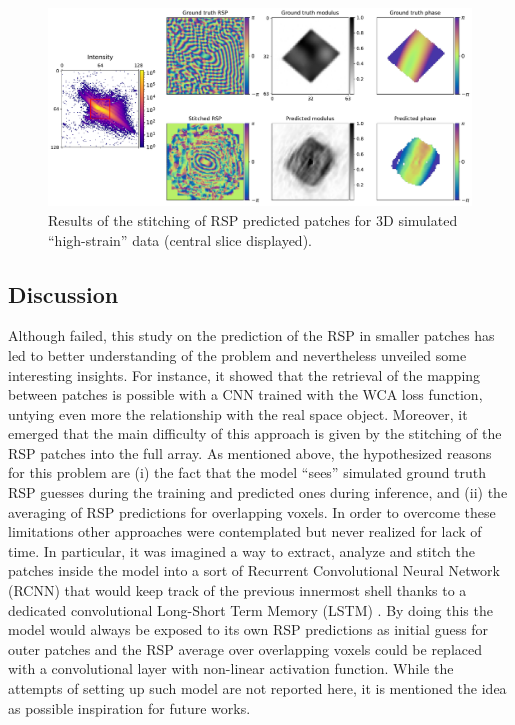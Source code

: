 \begin{figure}[H]
    \centering
    \includegraphics[width=\textwidth]{figures/Phasing/stitching_high_strain_sim.pdf}
    \caption{Results of the stitching of RSP predicted patches for 3D simulated ``high-strain'' data (central slice displayed).}
    \label{fig:stitching_highstrain}
\end{figure}

\subsection{Discussion}
Although failed, this study on the prediction of the RSP in smaller patches has led to better understanding of the problem 
and nevertheless unveiled some interesting insights. For instance, it showed that the retrieval of the mapping between patches 
is possible with a CNN trained with the WCA loss function, untying even more the relationship with the real space object. 
Moreover, it emerged that the main difficulty of this approach is given by the stitching of the RSP patches into the full 
array. As mentioned above, the hypothesized reasons for this problem are (i) the fact that the model ``sees'' 
simulated ground truth RSP guesses during the training and predicted ones during inference, and (ii) the averaging 
of RSP predictions for overlapping voxels. In order to overcome these limitations other approaches were contemplated but 
never realized for lack of time. In particular, it was imagined a way to extract, analyze and stitch the patches inside the 
model into a sort of Recurrent Convolutional Neural Network (RCNN) that would keep track of the previous innermost shell
thanks to a dedicated convolutional Long-Short Term Memory (LSTM) \cite{shi2015convolutionallstmnetworkmachine}. By doing 
this the model would always be exposed to its own RSP predictions as initial guess for outer patches and the RSP average over
overlapping voxels could be replaced with a convolutional layer with non-linear activation function. While the attempts 
of setting up such model are not reported here, it is mentioned the idea as possible inspiration for future works. \\

